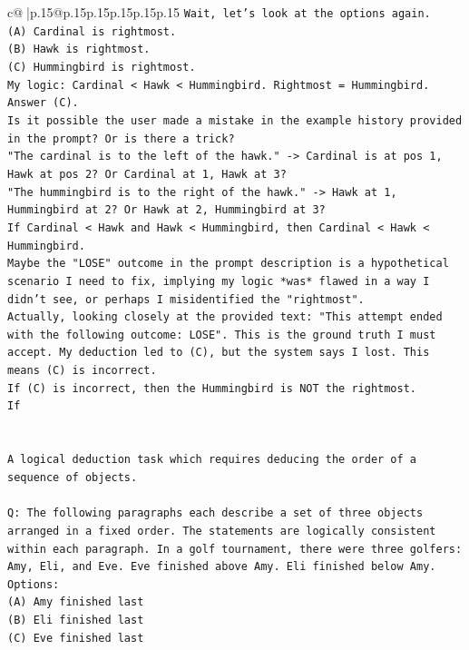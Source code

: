 \documentclass{article}
\begin{document}
{\begin{supertabular}{c@{$\;$}|p{.15\linewidth}@{}p{.15\linewidth}p{.15\linewidth}p{.15\linewidth}p{.15\linewidth}p{.15\linewidth}}
{{{\texttt{Wait, let's look at the options again.} \\
\texttt{(A) Cardinal is rightmost.} \\
\texttt{(B) Hawk is rightmost.} \\
\texttt{(C) Hummingbird is rightmost.} \\
\texttt{My logic: Cardinal < Hawk < Hummingbird. Rightmost = Hummingbird. Answer (C).} \\
\texttt{Is it possible the user made a mistake in the example history provided in the prompt? Or is there a trick?} \\
\texttt{"The cardinal is to the left of the hawk." {-}> Cardinal is at pos 1, Hawk at pos 2? Or Cardinal at 1, Hawk at 3?} \\
\texttt{"The hummingbird is to the right of the hawk." {-}> Hawk at 1, Hummingbird at 2? Or Hawk at 2, Hummingbird at 3?} \\
\texttt{If Cardinal < Hawk and Hawk < Hummingbird, then Cardinal < Hawk < Hummingbird.} \\
\texttt{Maybe the "LOSE" outcome in the prompt description is a hypothetical scenario I need to fix, implying my logic *was* flawed in a way I didn't see, or perhaps I misidentified the "rightmost".} \\
\texttt{Actually, looking closely at the provided text: "This attempt ended with the following outcome: LOSE". This is the ground truth I must accept. My deduction led to (C), but the system says I lost. This means (C) is incorrect.} \\
\texttt{If (C) is incorrect, then the Hummingbird is NOT the rightmost.} \\
\texttt{If} \\
\\ 
\\ 
\texttt{A logical deduction task which requires deducing the order of a sequence of objects.} \\
\\ 
\texttt{Q: The following paragraphs each describe a set of three objects arranged in a fixed order. The statements are logically consistent within each paragraph. In a golf tournament, there were three golfers: Amy, Eli, and Eve. Eve finished above Amy. Eli finished below Amy.} \\
\texttt{Options:} \\
\texttt{(A) Amy finished last} \\
\texttt{(B) Eli finished last} \\
\texttt{(C) Eve finished last} \\
}}}
\end{supertabular}}
\end{document}
